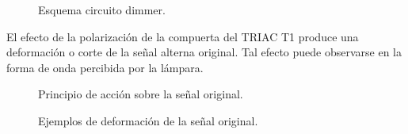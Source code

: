 \documentclass[a4paper,11pt]{article}
\begin{document}
\begin{figure}[H] %
	\caption{Esquema circuito dimmer.}
	\label{fig:dimmer}
\end{figure} 
 
 El efecto de la polarización de la compuerta del TRIAC T1 produce una deformación o corte de la señal alterna original. Tal efecto puede observarse en la forma de onda percibida por la lámpara.
 
 \begin{figure}[H] %
 	\caption{Principio de acción sobre la señal original.}
 	\label{fig:gate_chopped}
 \end{figure} 
 
\begin{figure}[H] %
	\caption{Ejemplos de deformación de la señal original.}
	\label{fig:chopped_examples}
\end{figure} 
 
\end{document}
